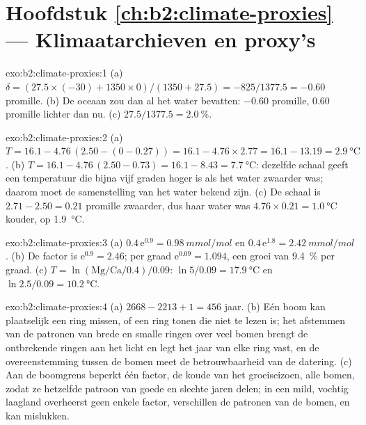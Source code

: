 \section*{Hoofdstuk \ref{ch:b2:climate-proxies} --- Klimaatarchieven en proxy's}

\begin{solution}{exo:b2:climate-proxies:1}
(a) $\delta = (27.5 \times (-30) + 1350 \times 0)/(1350 + 27.5) = -825/1377.5 = -0.60$ promille.
(b) De oceaan zou dan al het water bevatten: $-0.60$ promille, \num{0.60} promille lichter dan
nu. (c) $27.5/1377.5 = \qty{2.0}{\percent}$.
\end{solution}

\begin{solution}{exo:b2:climate-proxies:2}
(a) $T = 16.1 - 4.76\,(2.50 - (0 - 0.27)) = 16.1 - 4.76 \times 2.77 = 16.1 - 13.19 =
\qty{2.9}{\celsius}$. (b) $T = 16.1 - 4.76\,(2.50 - 0.73) = 16.1 - 8.43 = \qty{7.7}{\celsius}$: dezelfde
schaal geeft een temperatuur die bijna vijf graden hoger is als het water zwaarder was; daarom
moet de samenstelling van het water bekend zijn. (c) De schaal is $2.71 - 2.50 = 0.21$ promille zwaarder,
dus haar water was $4.76 \times 0.21 = \qty{1.0}{\celsius}$ kouder, op \qty{1.9}{\celsius}.
\end{solution}

\begin{solution}{exo:b2:climate-proxies:3}
(a) $0.4\,\mathrm{e}^{0.9} = \qty{0.98}{mmol/mol}$ en $0.4\,\mathrm{e}^{1.8} =
\qty{2.42}{mmol/mol}$. (b) De factor is $\mathrm{e}^{0.9} = 2.46$; per graad $\mathrm{e}^{0.09}
= 1.094$, een groei van \qty{9.4}{\percent} per graad. (c) $T = \ln(\text{Mg/Ca}/0.4)/0.09$:
$\ln 5/0.09 = \qty{17.9}{\celsius}$ en $\ln 2.5/0.09 = \qty{10.2}{\celsius}$.
\end{solution}

\begin{solution}{exo:b2:climate-proxies:4}
(a) $2668 - 2213 + 1 = 456$ jaar. (b) Eén boom kan plaatselijk een ring missen, of een ring tonen
die niet te lezen is; het afstemmen van de patronen van brede en smalle ringen over veel bomen brengt de
ontbrekende ringen aan het licht en legt het jaar van elke ring vast, en de overeenstemming tussen de bomen meet de
betrouwbaarheid van de datering. (c) Aan de boomgrens beperkt één factor, de koude van het groeiseizoen,
alle bomen, zodat ze hetzelfde patroon van goede en slechte jaren delen; in een mild, vochtig
laagland overheerst geen enkele factor, verschillen de patronen van de bomen, en kan  mislukken.
\end{solution}

